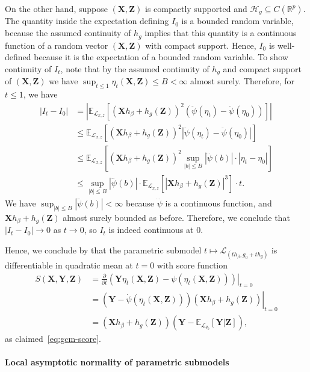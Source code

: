 \documentclass[aos]{imsart}
\theoremstyle{definition}
\theoremstyle{remark}
\newcommand{\E}{\mathbb E}								%
\newcommand{\R}{\mathbb{R}}								%
\newcommand{\prx}{\bm X}								%
\newcommand{\prz}{\bm Z}								%
\newcommand{\pry}{{\bm Y}}								%
\newcommand{\law}{\mathcal L}							%
\renewcommand{\H}{\mathcal H}		 					%
\begin{document}
On the other hand, suppose $(\prx,\prz)$ is compactly supported and $\H_g \subseteq C(\R^p)$. The quantity inside the expectation defining $I_0$ is a bounded random variable, because the assumed continuity of $h_g$ implies that this quantity is a continuous function of a random vector $(\prx, \prz)$ with compact support. Hence, $I_0$ is well-defined because it is the expectation of a bounded random variable. To show continuity of $I_t$, note that by the assumed continuity of $h_g$ and compact support of $(\prx,\prz)$ we have $\sup_{t \leq 1} \eta_t(\prx,\prz) \leq B < \infty$ almost surely. Therefore, for $t \leq 1$, we have
\begin{align*}
	|I_t-I_0|
	&
	=\left|\E_{\law_{x,z}}\left[(\prx h_\beta+h_g(\prz))^2(\ddot{\psi}(\eta_t)-\ddot{\psi}(\eta_0))\right]\right|\\
	&
	\leq \E_{\law_{x,z}}\left[(\prx h_\beta+h_g(\prz))^2|\ddot{\psi}(\eta_t)-\ddot{\psi}(\eta_0)|\right]\\
	&
	\leq \E_{\law_{x,z}}\left[(\prx h_\beta+h_g(\prz))^2\sup_{|b| \leq B}|\dddot{\psi}(b)| \cdot |\eta_t-\eta_0|\right]\\
	&
	\leq \sup_{|b| \leq B}|\dddot{\psi}(b)| \cdot \E_{\law_{x,z}}\left[|\prx h_\beta+h_g(\prz)|^3\right] \cdot t.
\end{align*}
We have $\sup_{|b| \leq B}|\dddot{\psi}(b)| < \infty$ because $\dddot \psi$ is a continuous function, and $\prx h_\beta+h_g(\prz)$ almost surely bounded as before. Therefore, we conclude that $|I_t - I_0| \rightarrow 0$ as $t \rightarrow 0$, so $I_t$ is indeed continuous at 0.

Hence, we conclude by \citet[Lemma 7.6]{VDV1998} that the parametric submodel $t \mapsto \law_{(th_\beta, g_0 + th_g)}$ is differentiable in quadratic mean at $t = 0$ with score function
\begin{align*}
S(\prx, \pry, \prz) &= \left.\frac{\partial}{\partial t}(\pry \eta_t(\prx, \prz) - \psi(\eta_t(\prx, \prz)))\right|_{t = 0} \\
&= \left.(\pry-\dot{\psi}(\eta_t(\prx, \prz)))(\prx h_\beta+h_g(\prz))\right|_{t = 0} \\
&= (\prx h_\beta+h_g(\prz))(\pry-\E_{\law_{\theta_0}}[\pry|\prz]),
\end{align*}
as claimed~\eqref{eq:gcm-score}.

\paragraph*{Local asymptotic normality of parametric submodels}
\end{document}
